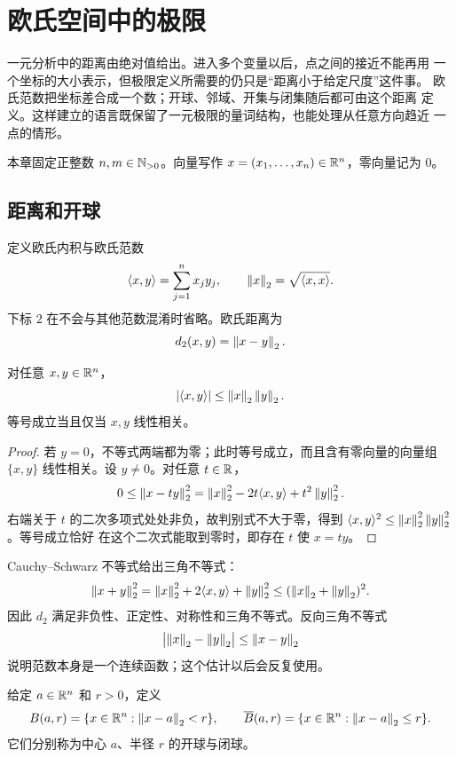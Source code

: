 \chapter{欧氏空间中的极限}
\label{chap:euclidean-limits}

一元分析中的距离由绝对值给出。进入多个变量以后，点之间的接近不能再用
一个坐标的大小表示，但极限定义所需要的仍只是“距离小于给定尺度”这件事。
欧氏范数把坐标差合成一个数；开球、邻域、开集与闭集随后都可由这个距离
定义。这样建立的语言既保留了一元极限的量词结构，也能处理从任意方向趋近
一点的情形。

本章固定正整数 \(n,m\in\mathbb{N}_{>0}\)。向量写作
\(x=(x_1,\ldots,x_n)\in\mathbb{R}^n\)，零向量记为 \(0\)。

\section{距离和开球}

定义欧氏内积与欧氏范数
\[
 \langle x,y\rangle=\sum_{j=1}^n x_jy_j,
 \qquad
 \left\lVert x\right\rVert_2=\sqrt{\langle x,x\rangle}.
\]
下标 \(2\) 在不会与其他范数混淆时省略。欧氏距离为
\[
 d_2(x,y)=\left\lVert x-y\right\rVert_2.
\]

\begin{theorem}
\label{thm:euclidean-cauchy-schwarz}
对任意 \(x,y\in\mathbb{R}^n\)，
\[
 \left|\langle x,y\rangle\right|\le \left\lVert x\right\rVert_2\left\lVert y\right\rVert_2.
\]
等号成立当且仅当 \(x,y\) 线性相关。
\end{theorem}

\begin{proof}
若 \(y=0\)，不等式两端都为零；此时等号成立，而且含有零向量的向量组
\(\{x,y\}\) 线性相关。设 \(y\ne0\)。对任意 \(t\in\mathbb{R}\)，
\[
 0\le \left\lVert x-ty\right\rVert_2^2
 =\left\lVert x\right\rVert_2^2-2t\langle x,y\rangle+t^2\left\lVert y\right\rVert_2^2.
\]
右端关于 \(t\) 的二次多项式处处非负，故判别式不大于零，得到
\(\langle x,y\rangle^2\le\left\lVert x\right\rVert_2^2\left\lVert y\right\rVert_2^2\)。等号成立恰好
在这个二次式能取到零时，即存在 \(t\) 使 \(x=ty\)。
\end{proof}

Cauchy--Schwarz 不等式给出三角不等式：
\[
 \left\lVert x+y\right\rVert_2^2
 =\left\lVert x\right\rVert_2^2+2\langle x,y\rangle+\left\lVert y\right\rVert_2^2
 \le(\left\lVert x\right\rVert_2+\left\lVert y\right\rVert_2)^2.
\]
因此 \(d_2\) 满足非负性、正定性、对称性和三角不等式。反向三角不等式
\[
 \bigl|\left\lVert x\right\rVert_2-\left\lVert y\right\rVert_2\bigr|\le\left\lVert x-y\right\rVert_2
\]
说明范数本身是一个连续函数；这个估计以后会反复使用。

\begin{definition}[开球与闭球]
给定 \(a\in\mathbb{R}^n\) 和 \(r>0\)，定义
\[
 B(a,r)=\{x\in\mathbb{R}^n:\left\lVert x-a\right\rVert_2<r\},\qquad
 \overline B(a,r)=\{x\in\mathbb{R}^n:\left\lVert x-a\right\rVert_2\le r\}.
\]
它们分别称为中心 \(a\)、半径 \(r\) 的开球与闭球。
\end{definition}

